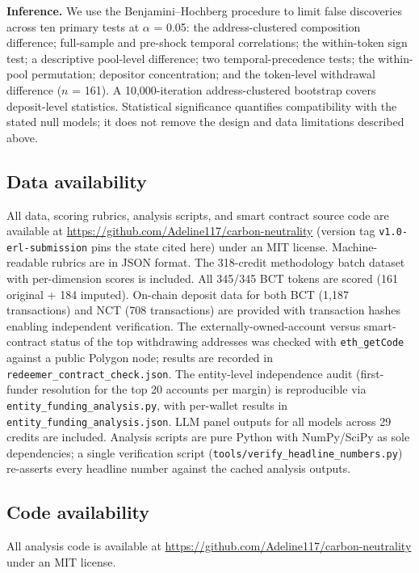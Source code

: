 \documentclass[sn-nature,Numbered]{sn-jnl}
\begin{document}
\textbf{Inference.} We use the Benjamini--Hochberg procedure to limit false discoveries across ten primary tests at $\alpha$ = 0.05: the address-clustered composition difference; full-sample and pre-shock temporal correlations; the within-token sign test; a descriptive pool-level difference; two temporal-precedence tests; the within-pool permutation; depositor concentration; and the token-level withdrawal difference ($n$ = 161). A 10,000-iteration address-clustered bootstrap covers deposit-level statistics. Statistical significance quantifies compatibility with the stated null models; it does not remove the design and data limitations described above.

\subsection*{Data availability}

All data, scoring rubrics, analysis scripts, and smart contract source code are available at \url{https://github.com/Adeline117/carbon-neutrality} (version tag \texttt{v1.0-erl-submission} pins the state cited here) under an MIT license. Machine-readable rubrics are in JSON format. The 318-credit methodology batch dataset with per-dimension scores is included. All 345/345 BCT tokens are scored (161 original + 184 imputed). On-chain deposit data for both BCT (1,187 transactions) and NCT (708 transactions) are provided with transaction hashes enabling independent verification. The externally-owned-account versus smart-contract status of the top withdrawing addresses was checked with \texttt{eth\_getCode} against a public Polygon node; results are recorded in \texttt{redeemer\_contract\_check.json}. The entity-level independence audit (first-funder resolution for the top 20 accounts per margin) is reproducible via \texttt{entity\_funding\_analysis.py}, with per-wallet results in \texttt{entity\_funding\_analysis.json}. LLM panel outputs for all models across 29 credits are included. Analysis scripts are pure Python with NumPy/SciPy as sole dependencies; a single verification script (\texttt{tools/verify\_headline\_numbers.py}) re-asserts every headline number against the cached analysis outputs.


\subsection*{Code availability}

All analysis code is available at \url{https://github.com/Adeline117/carbon-neutrality} under an MIT license.
\end{document}
